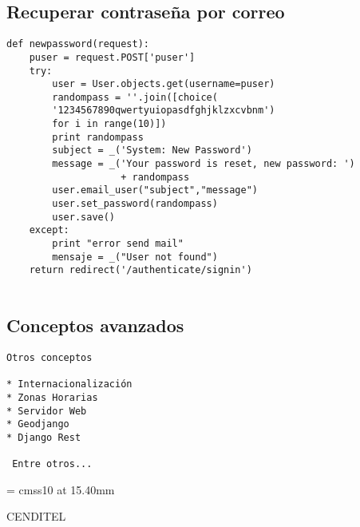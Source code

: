 \documentclass[xcolor=dvipsnames]{beamer}
\begin{document}
\subsection{Recuperar contraseña por correo}
\begin{frame}[fragile]
\begin{verbatim}
def newpassword(request):
    puser = request.POST['puser']
    try:
        user = User.objects.get(username=puser)
        randompass = ''.join([choice(
        '1234567890qwertyuiopasdfghjklzxcvbnm') 
        for i in range(10)])
        print randompass
        subject = _('System: New Password')
        message = _('Your password is reset, new password: ')
                    + randompass
        user.email_user("subject","message")
        user.set_password(randompass)
        user.save()
    except:
        print "error send mail"
        mensaje = _("User not found")
    return redirect('/authenticate/signin')
 
\end{verbatim}
\end{frame}

\subsection{Conceptos avanzados}
\begin{frame}[fragile]
\begin{verbatim}
Otros conceptos

* Internacionalización
* Zonas Horarias
* Servidor Web
* Geodjango
* Django Rest

 Entre otros...

\end{verbatim}
\end{frame}

\begin{frame}[plain]

  
      \begin{center}

        \font\endfont = cmss10 at 15.40mm
        \color{Brown}
        \endfont 
        \baselineskip 20.0mm

        CENDITEL

      \end{center}    

    
\end{frame}
\end{document}
